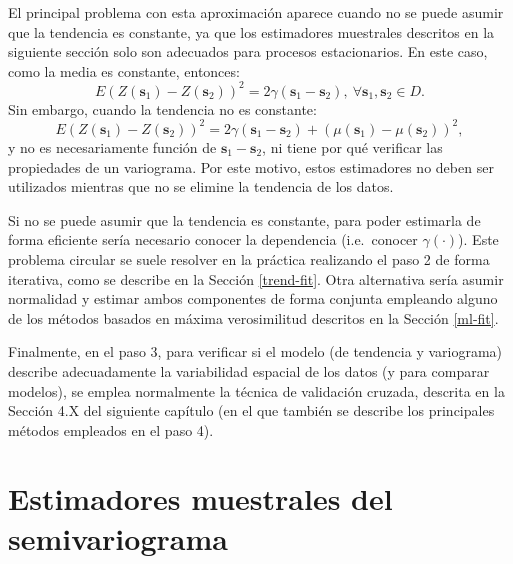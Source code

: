 \documentclass[
  spanish,
]{book}
\theoremstyle{break}
\theoremstyle{definition}
\theoremstyle{definition}
\theoremstyle{definition}
\theoremstyle{definition}
\theoremstyle{remark}
\begin{document}
El principal problema con esta aproximación aparece cuando no se puede asumir que la tendencia es constante, ya que los estimadores muestrales descritos en la siguiente sección solo son adecuados para procesos estacionarios.
En este caso, como la media es constante, entonces:
\begin{equation} 
  E(Z(\mathbf{s}_1) - Z(\mathbf{s}_{2}))^2 = 2\gamma(\mathbf{s}_1 -\mathbf{s}_{2}),
  \ \forall \mathbf{s}_1 ,\mathbf{s}_{2} \in D.
\label{eq:vario-est}
\end{equation}
Sin embargo, cuando la tendencia no es constante:
\begin{equation} 
  E(Z(\mathbf{s}_1) - Z(\mathbf{s}_{2}))^2 = 2\gamma(\mathbf{s}_1 - \mathbf{s}_{2}) 
  + \left( \mu(\mathbf{s}_1)-\mu(\mathbf{s}_{2})\right)^2,
\label{eq:vario-nest}
\end{equation}
y no es necesariamente función de \(\mathbf{s}_1 -\mathbf{s}_{2}\), ni tiene por qué verificar las propiedades de un variograma.
Por este motivo, estos estimadores no deben ser utilizados mientras que no se elimine la tendencia de los datos.

Si no se puede asumir que la tendencia es constante, para poder estimarla de forma eficiente sería necesario conocer la dependencia (i.e.~conocer \(\gamma(\cdot)\)).
Este problema circular se suele resolver en la práctica realizando el paso 2 de forma iterativa, como se describe en la Sección \ref{trend-fit}.
Otra alternativa sería asumir normalidad y estimar ambos componentes de forma conjunta empleando alguno de los métodos basados en máxima verosimilitud descritos en la Sección \ref{ml-fit}.

Finalmente, en el paso 3, para verificar si el modelo (de tendencia y variograma) describe adecuadamente la variabilidad espacial de los datos (y para comparar modelos), se emplea normalmente la técnica de validación cruzada, descrita en la Sección 4.X del siguiente capítulo (en el que también se describe los principales métodos empleados en el paso 4).

\hypertarget{vario-muestrales}{%
\section{Estimadores muestrales del semivariograma}\label{vario-muestrales}}
\end{document}
